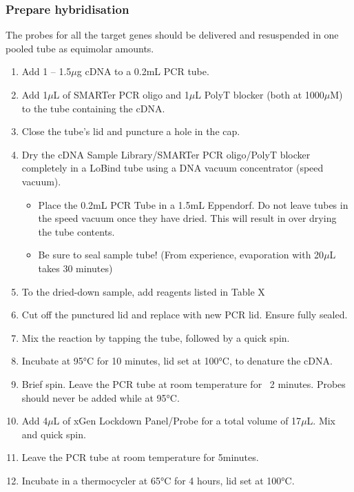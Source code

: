 \subsubsection{Prepare hybridisation}
\label{capture_prephyb}
The probes for all the target genes should be delivered and resuspended in one pooled tube as equimolar amounts. 
\begin{enumerate}
	\item Add 1 – 1.5$\mu$g cDNA to a 0.2mL PCR tube. 
	\item Add 1$\mu$L of SMARTer PCR oligo and 1$\mu$L PolyT blocker (both at 1000$\mu$M) to the tube containing the cDNA.
	\item Close the tube’s lid and puncture a hole in the cap.
	\item Dry the cDNA Sample Library/SMARTer PCR oligo/PolyT blocker completely in a LoBind tube using a DNA vacuum concentrator (speed vacuum).
	\begin{itemize}
		\item Place the 0.2mL PCR Tube in a 1.5mL Eppendorf. Do not leave tubes in the speed vacuum once they have dried. This will result in over drying the tube contents.
		\item Be sure to seal sample tube! (From experience, evaporation with 20$\mu$L takes 30 minutes)
	\end{itemize}
	\item To the dried-down sample, add reagents listed in Table X 
	\item Cut off the punctured lid and replace with new PCR lid. Ensure fully sealed.
	\item Mix the reaction by tapping the tube, followed by a quick spin. 
	\item Incubate at 95°C for 10 minutes, lid set at 100°C, to denature the cDNA. 
	\item Brief spin. Leave the PCR tube at room temperature for ~2 minutes. Probes should never be added while at 95°C. 
	\item Add 4$\mu$L of xGen Lockdown Panel/Probe for a total volume of 17$\mu$L. Mix and quick spin. 
	\item Leave the PCR tube at room temperature for 5minutes.
	\item Incubate in a thermocycler at 65°C for 4 hours, lid set at 100°C. 
\end{enumerate} 

